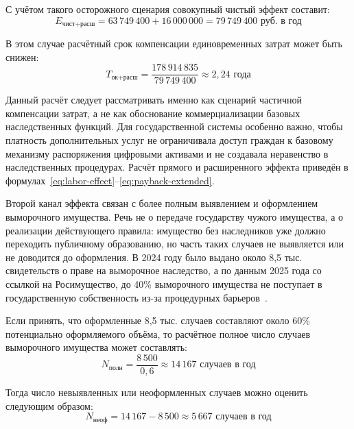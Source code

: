 С учётом такого осторожного сценария совокупный чистый эффект составит:
\begin{equation}
E_{\text{чист+расш}} = 63\,749\,400 + 16\,000\,000 = 79\,749\,400 \text{ руб. в год}
\label{eq:net-extended-effect}
\end{equation}

В этом случае расчётный срок компенсации единовременных затрат может быть снижен:
\begin{equation}
T_{\text{ок+расш}} = \frac{178\,914\,835}{79\,749\,400} \approx 2{,}24 \text{ года}
\label{eq:payback-extended}
\end{equation}

Данный расчёт следует рассматривать именно как сценарий частичной компенсации затрат, а не как обоснование коммерциализации базовых наследственных функций. Для государственной системы особенно важно, чтобы платность дополнительных услуг не ограничивала доступ граждан к базовому механизму распоряжения цифровыми активами и не создавала неравенство в наследственных процедурах. Расчёт прямого и расширенного эффекта приведён в формулах~\eqref{eq:labor-effect}--\eqref{eq:payback-extended}.

Второй канал эффекта связан с более полным выявлением и оформлением выморочного имущества. Речь не о передаче государству чужого имущества, а о реализации действующего правила: имущество без наследников уже должно переходить публичному образованию, но часть таких случаев не выявляется или не доводится до оформления. В 2024 году было выдано около 8{,}5 тыс. свидетельств о праве на выморочное наследство, а по данным 2025 года со ссылкой на Росимущество, до 40\% выморочного имущества не поступает в государственную собственность из-за процедурных барьеров~\cite{rosimushchestvo2025Escheat}.

Если принять, что оформленные 8{,}5 тыс. случаев составляют около 60\% потенциально оформляемого объёма, то расчётное полное число случаев выморочного имущества может составлять:
\begin{equation}
N_{\text{полн}} = \frac{8\,500}{0{,}6} \approx 14\,167 \text{ случаев в год}
\label{eq:escheat-total-cases}
\end{equation}

Тогда число невыявленных или неоформленных случаев можно оценить следующим образом:
\begin{equation}
N_{\text{неоф}} = 14\,167 - 8\,500 \approx 5\,667 \text{ случаев в год}
\label{eq:escheat-unregistered-cases}
\end{equation}

